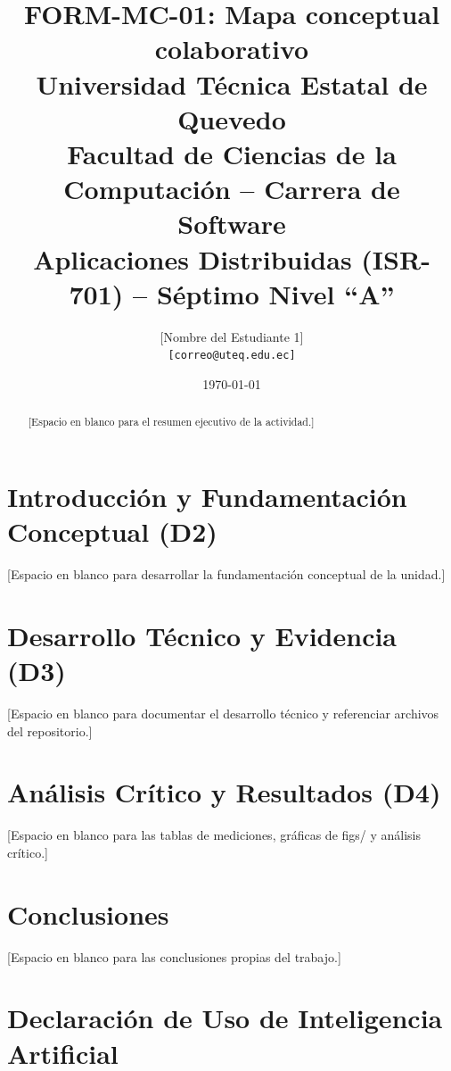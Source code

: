 \documentclass[11pt,a4paper]{article}
\title{\textbf{FORM-MC-01: Mapa conceptual colaborativo}\\[0.3cm]
\large Universidad Técnica Estatal de Quevedo\\
Facultad de Ciencias de la Computación -- Carrera de Software\\
Aplicaciones Distribuidas (ISR-701) -- Séptimo Nivel ``A''}
\author{[Nombre del Estudiante 1] \\ \texttt{[correo@uteq.edu.ec]}}
\date{\today}
\begin{document}
\maketitle

\begin{abstract}
[Espacio en blanco para el resumen ejecutivo de la actividad.]
\end{abstract}

\section{Introducción y Fundamentación Conceptual (D2)}
[Espacio en blanco para desarrollar la fundamentación conceptual de la unidad.]

\section{Desarrollo Técnico y Evidencia (D3)}
[Espacio en blanco para documentar el desarrollo técnico y referenciar archivos del repositorio.]

\section{Análisis Crítico y Resultados (D4)}
[Espacio en blanco para las tablas de mediciones, gráficas de figs/ y análisis crítico.]

\section{Conclusiones}
[Espacio en blanco para las conclusiones propias del trabajo.]

\section*{Declaración de Uso de Inteligencia Artificial}
\end{document}
